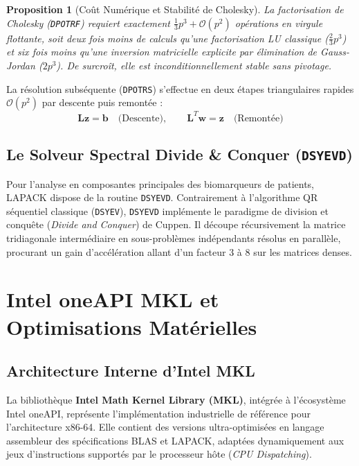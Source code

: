 \documentclass[11pt,a4paper]{report}
\theoremstyle{plain}
\newtheorem{proposition}{Proposition}[chapter]
\theoremstyle{definition}
\theoremstyle{remark}
\begin{document}
\begin{proposition}[Coût Numérique et Stabilité de Cholesky]
La factorisation de Cholesky (\texttt{DPOTRF}) requiert exactement $\frac{1}{3} p^3 + \mathcal{O}(p^2)$ opérations en virgule flottante, soit deux fois moins de calculs qu'une factorisation LU classique ($\frac{2}{3} p^3$) et six fois moins qu'une inversion matricielle explicite par élimination de Gauss-Jordan ($2 p^3$). De surcroît, elle est inconditionnellement stable sans pivotage.
\end{proposition}

La résolution subséquente (\texttt{DPOTRS}) s'effectue en deux étapes triangulaires rapides $\mathcal{O}(p^2)$ par descente puis remontée :
\begin{equation}
\mathbf{L} \mathbf{z} = \mathbf{b} \quad \text{(Descente)}, \qquad \mathbf{L}^T \mathbf{w} = \mathbf{z} \quad \text{(Remontée)}
\end{equation}

\section{Le Solveur Spectral Divide \& Conquer (\texttt{DSYEVD})}
Pour l'analyse en composantes principales des biomarqueurs de patients, LAPACK dispose de la routine \texttt{DSYEVD}. Contrairement à l'algorithme QR séquentiel classique (\texttt{DSYEV}), \texttt{DSYEVD} implémente le paradigme de division et conquête (\textit{Divide and Conquer}) de Cuppen. Il découpe récursivement la matrice tridiagonale intermédiaire en sous-problèmes indépendants résolus en parallèle, procurant un gain d'accélération allant d'un facteur 3 à 8 sur les matrices denses.

\chapter{Intel oneAPI MKL et Optimisations Matérielles}

\section{Architecture Interne d'Intel MKL}
La bibliothèque \textbf{Intel Math Kernel Library (MKL)}, intégrée à l'écosystème Intel oneAPI, représente l'implémentation industrielle de référence pour l'architecture x86-64. Elle contient des versions ultra-optimisées en langage assembleur des spécifications BLAS et LAPACK, adaptées dynamiquement aux jeux d'instructions supportés par le processeur hôte (\textit{CPU Dispatching}).
\end{document}
